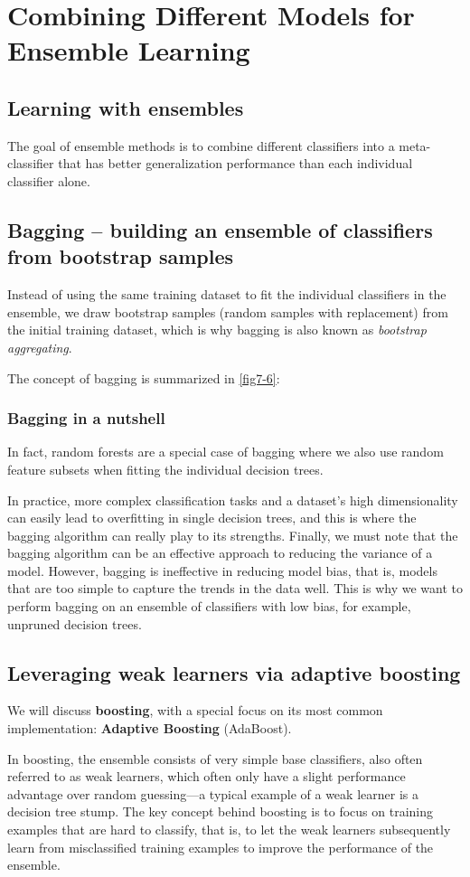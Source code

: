 \chapter{Combining Different Models for Ensemble Learning\label{Ch07}}
\section{Learning with ensembles}
The goal of ensemble methods is to combine different classifiers into a meta-classifier that has better generalization performance than each individual classifier alone.
\section{Bagging – building an ensemble of classifiers from bootstrap samples}
Instead of using the same training dataset to fit the individual classifiers in the ensemble, we draw bootstrap samples (random samples with replacement) from the initial training dataset, which is why bagging is also known as \textit{bootstrap aggregating}.

The concept of bagging is summarized in \autoref{fig7-6}:
\subsection{Bagging in a nutshell}
In fact, random forests are a special case of bagging where we also use random feature subsets when fitting the individual decision trees.

In practice, more complex classification tasks and a dataset's high dimensionality can easily lead to overfitting in single decision trees, and this is where the bagging algorithm can really play to its strengths. Finally, we must note that the bagging algorithm can be an effective approach to reducing the variance of a model. However, bagging is ineffective in reducing model bias, that is, models that are too simple to capture the trends in the data well. This is why we want to perform bagging on an ensemble of classifiers with low bias, for example, unpruned decision trees.
\section{Leveraging weak learners via adaptive boosting}
We will discuss \textbf{boosting}, with a special focus on its most common implementation: \textbf{Adaptive Boosting} (AdaBoost).

In boosting, the ensemble consists of very simple base classifiers, also often referred to as weak learners, which often only have a slight performance advantage over random guessing—a typical example of a weak learner is a decision tree stump. The key concept behind boosting is to focus on training examples that are hard to classify, that is, to let the weak learners subsequently learn from misclassified training examples to improve the performance of the ensemble.
